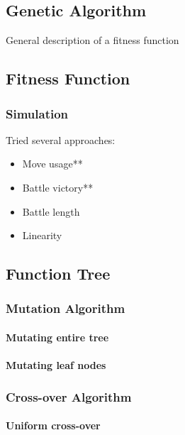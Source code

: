 \documentclass{acm_proc_article-sp}
\begin{document}
    \subsection{Genetic Algorithm}
        
        General description of a fitness function
    
    \subsection{Fitness Function}
    
        \subsubsection{Simulation}
            
            Tried several approaches:
            \begin{itemize}
                \item Move usage**
                \item Battle victory**
                \item Battle length
                \item Linearity
            \end{itemize}

    \subsection{Function Tree}

        \subsubsection{Mutation Algorithm}
        
            \paragraph{Mutating entire tree}
            
            \paragraph{Mutating leaf nodes}
        
        \subsubsection{Cross-over Algorithm}
        
            \paragraph{Uniform cross-over}
\end{document}
